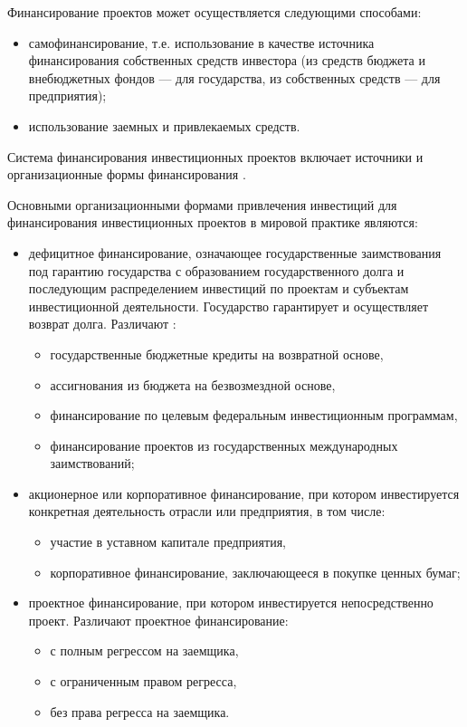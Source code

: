 Финансирование проектов может осуществляется следующими способами:
\begin{itemize}
	\item самофинансирование, т.е. использование в качестве источника финансирования собственных средств инвестора (из средств бюджета и внебюджетных фондов --- для государства, из собственных средств --- для предприятия);
	\item использование заемных и привлекаемых средств.
\end{itemize}

Система финансирования инвестиционных проектов включает источники и организационные формы финансирования \cite[268--269]{mazur}.

Основными организационными формами привлечения инвестиций для финансирования инвестиционных проектов в мировой практике являются:
\begin{itemize}
\item  дефицитное финансирование, означающее государственные заимствования под гарантию государства с образованием государственного долга и последующим распределением инвестиций по проектам и субъектам инвестиционной деятельности. Государство гарантирует и осуществляет возврат долга. Различают \cite[276--277]{mazur}:
	\begin{itemize}
		\item государственные бюджетные кредиты на возвратной основе,
		\item ассигнования из бюджета на безвозмездной основе,
		\item финансирование по целевым федеральным инвестиционным программам,
		\item финансирование проектов из государственных международных заимствований;
	\end{itemize}
\item акционерное или корпоративное финансирование, при котором инвестируется конкретная деятельность отрасли или предприятия, в том числе:
	\begin{itemize}
		\item участие в уставном капитале предприятия,
		\item корпоративное финансирование, заключающееся в покупке ценных бумаг;
	\end{itemize}
\item проектное финансирование, при котором инвестируется непосредственно проект. Различают проектное финансирование:
	\begin{itemize}
		\item с полным регрессом на заемщика,
		\item с ограниченным правом регресса,
		\item без права регресса на заемщика.
	\end{itemize}
\end{itemize}

